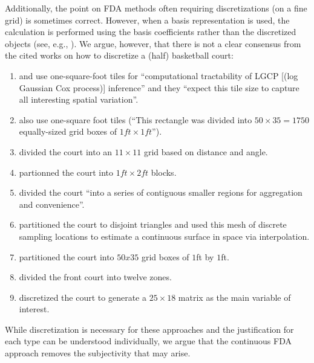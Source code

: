 {	Additionally, the point on FDA methods often requiring discretizations (on a fine grid) is sometimes  correct. However, when a basis representation is used, the calculation is performed using the basis coefficients rather than the discretized objects (see, e.g., \cite{ramsayFunctionalDataAnalysis2005}).
	We argue, however, that there is not a clear consensus from the cited works on how to discretize a (half) basketball court:
	\begin{enumerate}
		\item \cite{millerFactorizedPointProcess2014} and \cite{franksCharacterizingSpatialStructure2015} use one-square-foot tiles for ``computational tractability of LGCP [(log Gaussian Cox process)] inference'' and they ``expect this tile size to capture all interesting spatial variation''.
		\item \cite{yinBayesianNonparametricLearning2022} also use one-square foot tiles (``This rectangle was divided into $50 \times 35 = 1750$ equally-sized grid boxes of $1ft \times 1ft$'').
		\item \cite{reichSpatialAnalysisBasketball2006} divided the court into an $11 \times 11$ grid based on distance and angle.
		\item \cite{huZeroinflatedPoissonModel2023} partionned the court into $1ft \times 2ft$ blocks.
		\item \cite{fuHoopInSightAnalyzingComparing2024} divided the court ``into a series of contiguous smaller regions for aggregation and convenience''.
		\item \cite{huBayesianGroupLearning2021} partitioned the court to disjoint triangles and used this mesh of discrete sampling locations to estimate a continuous surface in space via interpolation.
		\item \cite{jiaoBayesianMarkedSpatial2021} partitioned the court into $50 x 35$ grid boxes of $1$ft by $1$ft.
		\item \cite{wong-toiJointAnalysisField2022} divided the front court into twelve zones.
		\item \cite{yinAnalysisProfessionalBasketball2023} discretized the court to generate a $25 \times 18$ matrix as the main variable of interest.
	\end{enumerate}
	While discretization is necessary for these approaches and the justification for each type can be understood individually, we argue that the continuous FDA approach removes the subjectivity that may arise.
}

